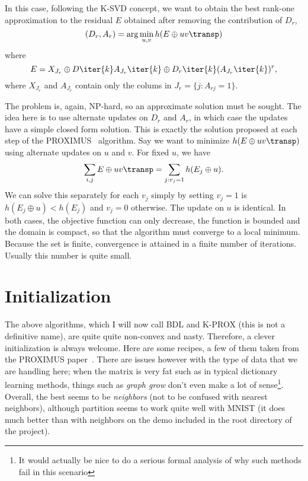 \documentclass[a4paper,11pt]{article}
\begin{document}
In this case, following the K-SVD concept, we want to obtain the best rank-one approximation to the residual $E$ obtained after removing the contribution of $D_r$, 
\begin{equation}
(D_r,A_r) = \arg\min_{u,v} h(E \oplus uv\transp)
\label{eq:bsvd1}
\end{equation}
where
\begin{equation}
E =  X_{J_r} \oplus D\iter{k}A_{J_r}\iter{k} \oplus D_r\iter{k}(A_{J_r}\iter{k})^r,
\label{eq:bsvd2}
\end{equation}
where $X_{J_r}$ and $A_{J_r}$ contain only the colums in $J_r = \{j: A_{rj} = 1 \}$.

The problem   is, again, NP-hard, so an approximate solution must be sought. The idea here is to use alternate updates on $D_r$ and $A_r$, in which case the updates have a simple closed form solution. This is exactly the solution proposed at each step of the PROXIMUS~\cite{proximus} algorithm. Say we want to minimize $h(E \oplus uv\transp)$ using alternate updates on $u$ and $v$. For fixed $u$, we have
$$
\sum_{i,j} E \oplus uv\transp = \sum_{j: v_j = 1} h(E_j \oplus u).
$$
We can solve this separately for each $v_j$ simply by setting $v_j = 1$ is $h(E_j \oplus u) < h(E_j)$ and $v_j=0$ otherwise. The update on $u$ is identical. In both cases, the objective function can only decrease, the function is bounded and the domain is compact, so that the algorithm must converge to a local minimum. Because the set is finite, convergence is attained in a finite number of iterations. Usually this number is quite small.


\section{Initialization}

The above algorithms, which I will now call BDL and K-PROX (this is not a definitive name), are
quite quite non-convex and nasty. Therefore, a clever initialization is always welcome. Here are
some recipes, a few of them taken from the PROXIMUS paper~\cite{proximus}. There are issues however
with the type of data that we are handling here; when the matrix is very fat such as in typical
dictionary learning methods, things such as \emph{graph grow} don't even make a lot of
sense\footnote{It would actually be nice to do a serious formal analysis of why such methods fail in
  this scenario}. Overall, the best seems to be \emph{neighbors} (not to be confused with nearest neighbors), although partition seems to
work quite well with MNIST (it does much better than with neighbors on the demo included in the root
directory of the project).
\end{document}
